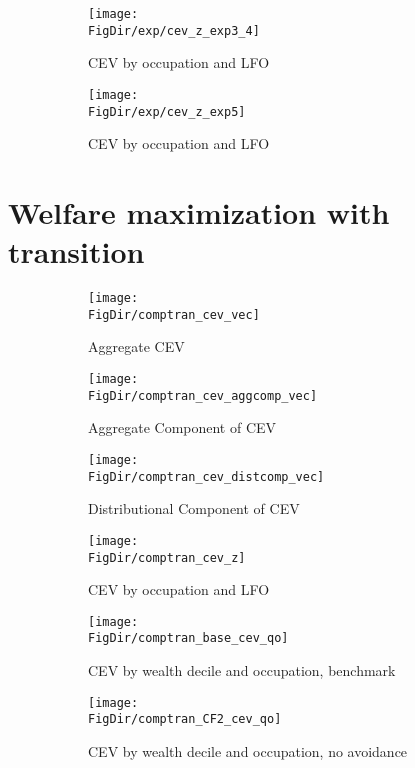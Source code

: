 \documentclass[11pt,english]{article}
\newcommand*{\FigDir}{../figures} %
\begin{document}
\begin{figure}[htbp]
	\centering
	\begin{subfigure}[b]{0.46\textwidth}
		\centering
		\texttt{[image: \\FigDir/exp/cev\_z\_exp3\_4]}
		\caption{CEV by occupation and LFO}
	\end{subfigure} 
	\begin{subfigure}[b]{0.46\textwidth}
		\centering
		\texttt{[image: \\FigDir/exp/cev\_z\_exp5]}
		\caption{CEV by occupation and LFO}
	\end{subfigure}
	
	\caption{}
	\label{fig:exp_cev}
\end{figure}
\FloatBarrier



\section{Welfare maximization with transition}





\begin{figure}[htbp]
	\centering
	\begin{subfigure}[b]{0.49\textwidth}
		\centering
		\texttt{[image: \\FigDir/comptran\_cev\_vec]}
		\caption{Aggregate CEV}
	\end{subfigure}
	\begin{subfigure}[b]{0.49\textwidth}
		\centering
		\texttt{[image: \\FigDir/comptran\_cev\_aggcomp\_vec]}
		\caption{Aggregate Component of CEV}
	\end{subfigure} 

	\begin{subfigure}[b]{0.49\textwidth}
		\centering
		\texttt{[image: \\FigDir/comptran\_cev\_distcomp\_vec]}
		\caption{Distributional Component of CEV}
	\end{subfigure} 
	\begin{subfigure}[b]{0.49\textwidth}
	\centering
	\texttt{[image: \\FigDir/comptran\_cev\_z]}
	\caption{CEV by occupation and LFO}
\end{subfigure} 

\begin{subfigure}[b]{0.49\textwidth}
	\centering
	\texttt{[image: \\FigDir/comptran\_base\_cev\_qo]}
	\caption{CEV by wealth decile and occupation, benchmark}
\end{subfigure} 	
\begin{subfigure}[b]{0.49\textwidth}
	\centering
	\texttt{[image: \\FigDir/comptran\_CF2\_cev\_qo]}
	\caption{CEV by wealth decile and occupation, no avoidance}
\end{subfigure} 
	\caption{}
	\label{fig:comptran_CEV}
\end{figure}	




	
\end{document}
